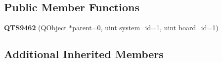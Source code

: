 \subsection*{Public Member Functions}
\begin{DoxyCompactItemize}
\item 
{\bfseries Q\+T\+S9462} (Q\+Object $\ast$parent=0, uint system\+\_\+id=1, uint board\+\_\+id=1)\hypertarget{class_q_t_s9462_a593b946f814029a41a2efe72e6a91b48}{}\label{class_q_t_s9462_a593b946f814029a41a2efe72e6a91b48}

\end{DoxyCompactItemize}
\subsection*{Additional Inherited Members}
